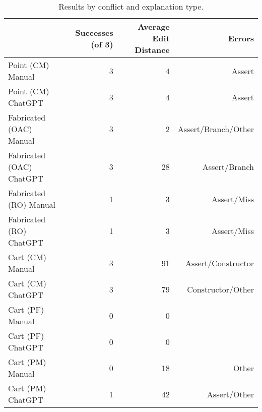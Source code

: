 \begin{table}[t]
    \centering
    \begin{tabular}{@{\extracolsep{\fill}} lrrr} \toprule
                             & Successes (of 3) & Average Edit Distance & Errors \\
    \midrule
    Point (CM) Manual        & 3 & 4 & Assert \\
    Point (CM) ChatGPT       & 3 & 4 & Assert \\
    Fabricated (OAC) Manual  & 3 & 2 & Assert/Branch/Other \\
    Fabricated (OAC) ChatGPT & 3 & 28 & Assert/Branch \\
    Fabricated (RO) Manual   & 1 & 3 & Assert/Miss \\
    Fabricated (RO) ChatGPT  & 1 & 3 & Assert/Miss \\
    Cart (CM) Manual         & 3 & 91 & Assert/Constructor \\
    Cart (CM) ChatGPT        & 3 & 79 & Constructor/Other \\
    Cart (PF) Manual         & 0 & 0 &  \\
    Cart (PF) ChatGPT        & 0 & 0 &  \\
    Cart (PM) Manual         & 0 & 18 & Other \\
    Cart (PM) ChatGPT        & 1 & 42 & Assert/Other \\
    \midrule
    \end{tabular}
    \caption{Results by conflict and explanation type.\label{tab:results:rq2}}
\end{table}

